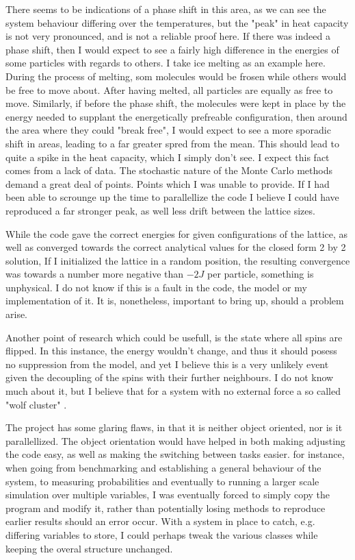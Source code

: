 \documentclass[10pt, twocolumn]{revtex4-1}
\begin{document}
There seems to be indications of a phase shift in this area, as we can see the system behaviour differing over the temperatures, but the "peak" in heat
capacity is not very pronounced, and is not a reliable proof here. If there was indeed a phase shift, then I would expect to see a fairly high difference
in the energies of some particles with regards to others. I take ice melting as an example here. During the process of melting, som molecules would be frosen
while others would be free to move about. After having melted, all particles are equally as free to move. Similarly, if before the phase shift, the molecules
were kept in place by the energy needed to supplant the energetically prefreable configuration, then around the area where they could "break free", I would
expect to see a more sporadic shift in areas, leading to a far greater spred from the mean. This should lead to quite a spike in the heat capacity, which I
simply don't see. I expect this fact comes from a lack of data. The stochastic nature of the Monte Carlo methods demand a great deal of points. Points which I
was unable to provide. If I had been able to scrounge up the time to parallellize the code I believe I could have reproduced a far stronger peak, as well less
drift between the lattice sizes.

While the code gave the correct energies for given configurations of the lattice, as well as converged towards the correct analytical values for the closed
form 2 by 2 solution, If I initialized the lattice in a random position, the resulting convergence was towards a number more negative than $-2J$ per particle,
something is unphysical. I do not know if this is a fault in the code, the model or my implementation of it. It is, nonetheless, important to bring up, should
a problem arise.

Another point of research which could be usefull, is the state where all spins are flipped. In this instance, the energy wouldn't change, and thus it should
posess no suppression from the model, and yet I believe this is a very unlikely event given the decoupling of the spins with their further neighbours. I do
not know much about it, but I believe that for a system with no external force a so called "wolf cluster" \cite{WolfCluster}.

The project has some glaring flaws, in that it is neither object oriented, nor is it parallellized. The object orientation would have helped in both making
adjusting the code easy, as well as making the switching between tasks easier. for instance, when going from benchmarking and establishing a general
behaviour of the system, to measuring probabilities and eventually to running a larger scale simulation over multiple variables, I was eventually forced
to simply copy the program and modify it, rather than potentially losing methods to reproduce earlier results should an error occur. With a system in place
to catch, e.g. differing variables to store, I could perhaps tweak the various classes while keeping the overal structure unchanged.
\end{document}
